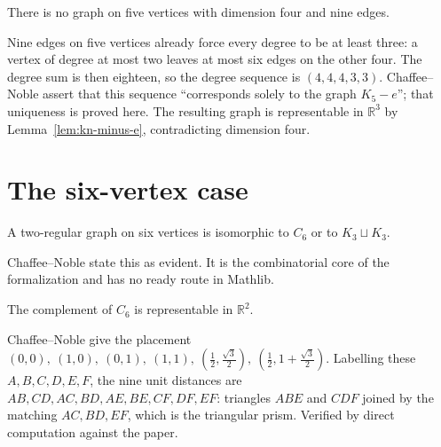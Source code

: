 \begin{lemma}
  \label{lem:five-vertices}
  \leanok
  There is no graph on five vertices with dimension four and nine edges.

  Nine edges on five vertices already force every degree to be at least three: a vertex of
  degree at most two leaves at most six edges on the other four. The degree sum is then
  eighteen, so the degree sequence is $(4,4,4,3,3)$. Chaffee--Noble assert that this sequence
  ``corresponds solely to the graph $K_5 - e$''; that uniqueness is proved here. The resulting
  graph is representable in $\mathbb{R}^3$ by Lemma~\ref{lem:kn-minus-e}, contradicting
  dimension four.
\end{lemma}

\section{The six-vertex case}

\begin{lemma}
  \label{lem:two-regular-six}
  \leanok
  A two-regular graph on six vertices is isomorphic to $C_6$ or to $K_3 \sqcup K_3$.

  Chaffee--Noble state this as evident. It is the combinatorial core of the formalization and has
  no ready route in Mathlib.
\end{lemma}

\begin{lemma}
  \label{lem:prism-planar}
  \leanok
  The complement of $C_6$ is representable in $\mathbb{R}^2$.

  Chaffee--Noble give the placement
  $(0,0),\ (1,0),\ (0,1),\ (1,1),\ (\tfrac12, \tfrac{\sqrt3}{2}),\ (\tfrac12, 1 + \tfrac{\sqrt3}{2})$.
  Labelling these $A,B,C,D,E,F$, the nine unit distances are
  $AB, CD, AC, BD, AE, BE, CF, DF, EF$:
  triangles $ABE$ and $CDF$ joined by the matching $AC, BD, EF$, which is the triangular prism.
  Verified by direct computation against the paper.
\end{lemma}

